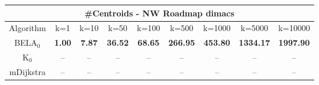 \begin{tabular}{c|cccccccc}\toprule
\multicolumn{9}{c}{#Centroids - NW Roadmap dimacs}\\ \midrule
Algorithm & k=1 & k=10 & k=50 & k=100 & k=500 & k=1000 & k=5000 & k=10000 \\ \midrule
BELA$_0$ & \textbf{1.00} & \textbf{7.87} & \textbf{36.52} & \textbf{68.65} & \textbf{266.95} & \textbf{453.80} & \textbf{1334.17} & \textbf{1997.90} \\
K$_0$ & -- & -- & -- & -- & -- & -- & -- & -- \\
mDijkstra & -- & -- & -- & -- & -- & -- & -- & -- \\ \bottomrule 
\end{tabular}
